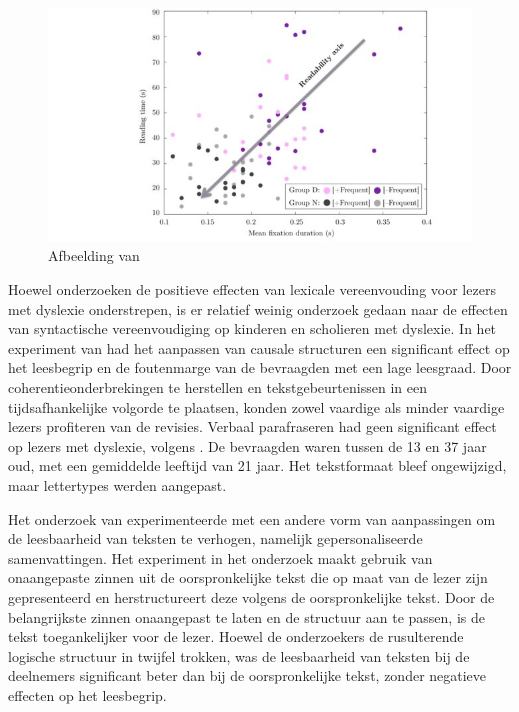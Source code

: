 \medspace

\begin{figure}
\includegraphics[width=\linewidth]{img/readability-mean-fixation-duration.png}
\caption{Afbeelding van \textcite{Rello2013a}}
\label{img:readability-mean-fixation-duration}
\end{figure}

\medspace

Hoewel onderzoeken de positieve effecten van lexicale vereenvouding voor lezers met dyslexie onderstrepen, is er relatief weinig onderzoek gedaan naar de effecten van syntactische vereenvoudiging op kinderen en scholieren met dyslexie. In het experiment van \textcite{Linderholm2000} had het aanpassen van causale structuren een significant effect op het leesbegrip en de foutenmarge van de bevraagden met een lage leesgraad. Door coherentieonderbrekingen te herstellen en tekstgebeurtenissen in een tijdsafhankelijke volgorde te plaatsen, konden zowel vaardige als minder vaardige lezers profiteren van de revisies. Verbaal parafraseren had geen significant effect op lezers met dyslexie, volgens \textcite{Rello2013c}. De bevraagden waren tussen de 13 en 37 jaar oud, met een gemiddelde leeftijd van 21 jaar. Het tekstformaat bleef ongewijzigd, maar lettertypes werden aangepast.

\medspace

Het onderzoek van \textcite{Nandhini2013} experimenteerde met een andere vorm van aanpassingen om de leesbaarheid van teksten te verhogen, namelijk gepersonaliseerde samenvattingen. Het experiment in het onderzoek maakt gebruik van onaangepaste zinnen uit de oorspronkelijke tekst die op maat van de lezer zijn gepresenteerd en herstructureert deze volgens de oorspronkelijke tekst. Door de belangrijkste zinnen onaangepast te laten en de structuur aan te passen, is de tekst toegankelijker voor de lezer. Hoewel de onderzoekers de rusulterende logische structuur in twijfel trokken, was de leesbaarheid van teksten bij de deelnemers significant beter dan bij de oorspronkelijke tekst, zonder negatieve effecten op het leesbegrip.


